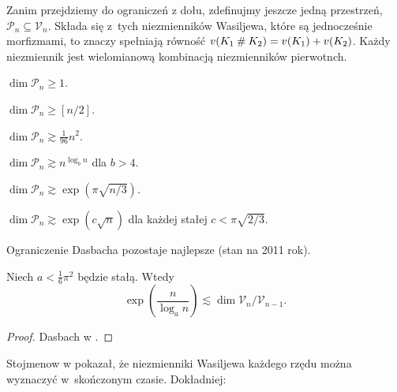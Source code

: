 Zanim przejdziemy do ograniczeń z dołu, zdefinujmy jeszcze jedną przestrzeń, $\mathcal P_n \subseteq \mathcal V_n$.
Składa się z~tych niezmienników Wasiljewa, które są jednocześnie morfizmami, to znaczy spełniają równość $v(K_1 \mathbin{\#} K_2) = v(K_1) + v(K_2)$.
Każdy niezmiennik jest wielomianową kombinacją niezmienników pierwotnch.

\begin{proposition}
    $\dim \mathcal P_n \ge 1$.
\end{proposition}

\begin{proposition}
    $\dim \mathcal P_n \ge [n/2]$.
\end{proposition}

\begin{proposition}[Duzhin, 1996]
    $\dim \mathcal P_n \gtrsim \frac{1}{96} n^2$.
\end{proposition}

\begin{proposition}
    $\dim \mathcal P_n \gtrsim n^{\log_b n}$ dla $b > 4$.
\end{proposition}

\begin{proposition}[Koncewicz, 1997]
    $\dim \mathcal P_n \gtrsim \exp (\pi \sqrt{n/3})$.
\end{proposition}

\begin{proposition}[Dasbach, 2000]
    $\dim \mathcal P_n \gtrsim \exp (c \sqrt{n})$ dla każdej stałej $c < \pi \sqrt{2/3}$.
\end{proposition}

Ograniczenie Dasbacha pozostaje najlepsze (stan na 2011 rok).

\begin{corollary}
    Niech $a < \frac 1 6 \pi^2$ będzie stałą.
    Wtedy
    \begin{equation}
        \exp \left(\frac {n}{\log_a n} \right) \lesssim \dim \mathcal V_n / \mathcal V_{n-1}.
    \end{equation}
\end{corollary}

\begin{proof}
    Dasbach w \cite{dasbach00}.
\end{proof}

Stojmenow w \cite{stoimenow_01} pokazał, że niezmienniki Wasiljewa każdego rzędu można wyznaczyć w~skończonym czasie.
Dokładniej:

